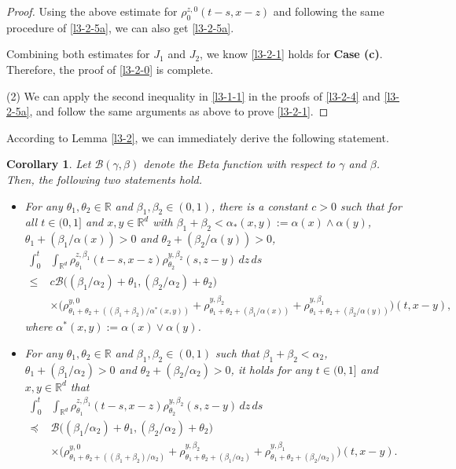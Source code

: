 \documentclass[a4paper,11pt]{amsart}
\renewcommand{\le}{\leqslant}
\newcommand{\R}{\mathds R}
\newcommand{\B}{\beta}
\newcommand{\T}{\theta}
\newcommand{\p}{\preceq}
\newcommand{\A}{\alpha}
\newcommand{\Bb}{\mathscr{B}}
\newtheorem{corollary}[theorem]{Corollary}
\theoremstyle{definition}
\begin{document}
\begin{proof}
Using the above estimate for $\rho_0^{z,0}(t-s,x-z)$ and following the same procedure of \eqref{l3-2-5a},  we
can also get \eqref{l3-2-5a}.

Combining both estimates for $J_1$ and $J_2$, we know \eqref{l3-2-1} holds for {\bf Case (c)}.
Therefore, the proof of \eqref{l3-2-0} is complete.


(2) We can apply the second inequality in \eqref{l3-1-1} in the proofs of
\eqref{l3-2-4} and \eqref{l3-2-5a}, and follow the same arguments as above to prove \eqref{l3-2-1}.
\end{proof}


According to Lemma \ref{l3-2}, we can immediately derive the following statement.
\begin{corollary}\label{l3-3} Let $\Bb(\gamma,\beta)$ denote the Beta function with respect to $\gamma$ and $\beta$. Then, the following two statements hold.
\begin{itemize}
\item[(1)] For any $\theta_1,\theta_2\in \R$ and $\beta_1,\beta_2 \in (0,1)$, there is a constant $c>0$ such that for all $t\in (0,1]$ and $x,y \in \R^d$  with $\B_1+\B_2<\A_*(x,y):=\A(x)\wedge\A(y)$,
$\T_1+({\B_1}/{\A(x)})>0$ and $\T_2+({\B_2}/{\A(y)})>0$,
\begin{equation}\label{l3-3-0}
\begin{split}
\int_0^t&\int_{\R^d} \rho_{\T_1}^{z,\beta_1}(t-s,x-z)\rho_{\T_2}^{y,\beta_2}(s,z-y)\,dz\,ds\\
\le &c\Bb\big(({\B_1}/{\A_2})+\T_1,({\B_2}/{\A_2})+\T_2\big)\\
&\times \Big(
\rho_{\T_1+\T_2+(({\B_1+\B_2})/{\A^*(x,y)})}^{y,0}+
\rho_{\T_1+\T_2+({\B_1}/{\A(x)})}^{y,\B_2}
+\rho_{\T_1+\T_2+({\B_2}/{\A(y)})}^{y,\B_1}\Big)(t,x-y),
\end{split}
\end{equation}
where $\A^*(x,y):= \A(x)\vee\A(y)$.

\item[(2)] For any $\theta_1,\theta_2\in \R$ and $\beta_1,\beta_2 \in (0,1)$ such that $\B_1+\B_2<\A_2$,  $\T_1+({\B_1}/{\A_2})>0$ and $\T_2+({\B_2}/{\A_2})>0$,
it holds  for any $t\in (0,1]$ and $x,y \in \R^d$ that
\begin{equation}\label{l3-3-1}
\begin{split}
\int_0^t&\int_{\R^d} \rho_{\T_1}^{z,\beta_1}(t-s,x-z)\rho_{\T_2}^{y,\beta_2}(s,z-y)\,dz\,ds\\
\p&\Bb\big(({\B_1}/{\A_2})+\T_1,({\B_2}/{\A_2})+\T_2\big)
\\
&\times \big(
\rho_{\T_1+\T_2+(({\B_1+\B_2})/{\A_2})}^{y,0}+\rho_{\T_1+\T_2+({\B_1}/{\A_2})}^{y,\B_2}
+\rho_{\T_1+\T_2+({\B_2}/{\A_2})}^{y,\B_1}\big)(t,x-y).
\end{split}
\end{equation}
\end{itemize}
\end{corollary}
\end{document}
